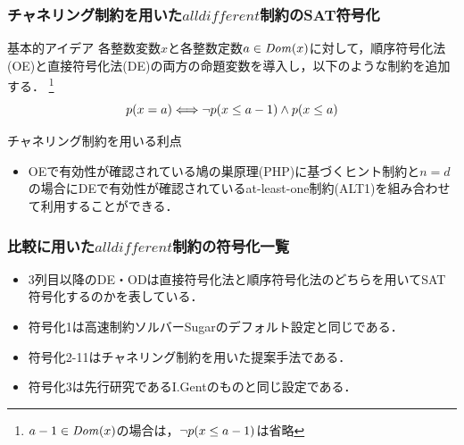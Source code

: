 \documentclass [dvipdfmx,11pt]{beamer}
\newcommand{\alldifferent}{$alldifferent$}
\begin{document}
\begin{frame}
    \frametitle{チャネリング制約を用いた{\alldifferent}制約のSAT符号化}
    \begin{block}{基本的アイデア}
        各整数変数$x$と各整数定数$a \in {\it Dom}(x)$に対して，順序符号化法(OE)と直接符号化法(DE)の両方の命題変数を導入し，以下のような制約を追加する．
        \footnote{$a-1 \in {\it Dom}(x)$の場合は，$\lnot p(x\le a-1)$は省略}
        \[
            p(x=a) \Longleftrightarrow \lnot p(x\le a-1) \land p(x\le a)
        \]
    \end{block}
    \begin{alertblock}{チャネリング制約を用いる利点}
        \begin{itemize}
            \item OEで有効性が確認されている鳩の巣原理(PHP)に基づくヒント制約と$n=d$の場合にDEで有効性が確認されているat-least-one制約(ALT1)を組み合わせて利用することができる．
        \end{itemize}
    \end{alertblock}
\end{frame}



\begin{frame}
    \frametitle{比較に用いた{\alldifferent}制約の符号化一覧}
    \begin{block}{}\centering
        {\tiny }
    \end{block}
    \begin{itemize}
        \item 3列目以降のDE・ODは直接符号化法と順序符号化法のどちらを用いてSAT符号化するのかを表している．
        \item 符号化1は高速制約ソルバーSugarのデフォルト設定と同じである．
        \item 符号化2-11はチャネリング制約を用いた提案手法である．
        \item 符号化3は先行研究であるI.Gentのものと同じ設定である．
    \end{itemize}
\end{frame}
\end{document}
